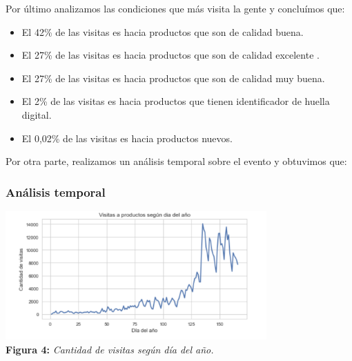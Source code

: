 \documentclass[titlepage,a4paper]{article}
\begin{document}
	Por último analizamos las condiciones que más visita la gente y concluímos que:
	\begin{itemize}
    \item El 42\% de las visitas es hacia productos que son de calidad buena.
    \item El 27\% de las visitas es hacia productos que son de calidad excelente .
    \item El 27\% de las visitas es hacia productos que son de calidad muy buena.
        \item El 2\% de las visitas es hacia  productos que tienen identificador de huella digital. 
        	\item El 0,02\%  de las visitas es hacia  productos nuevos.    
	\end{itemize}
	Por otra parte, realizamos un análisis temporal sobre el evento y obtuvimos que:
	\subsubsection{Análisis temporal}
	\begin{center}
	\includegraphics[width=10cm]{VisitasAProductosSegunDiaAnio.jpg}\\
	\textbf{Figura 4:}  \textit{Cantidad de visitas según día del año.  }
	\end{center}
\end{document}
